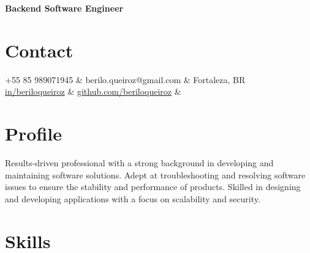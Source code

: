 \documentclass[11pt,a4paper,sans]{moderncv}
\begin{document}
\makecvtitle
\vspace*{-16mm}
\begin{center}\textbf{Backend Software Engineer}\end{center}

\section{Contact}{
  \begin{center}
	  \faMobile\enspace +55 85 989071945                                                                  & \enspace berilo.queiroz@gmail.com & \enspace\faHome\enspace Fortaleza, BR \\
	  \faLinkedin\enspace \color{blue} \href{https://www.linkedin.com/in/beriloqueiroz}{in/beriloqueiroz} &
	  \faGithub\enspace \color{blue} \href{https://github.com/beriloqueiroz}{github.com/beriloqueiroz}    & \enspace
  \end{center}
 }

\section{Profile}
 {
  Results-driven professional with a strong background in developing and maintaining software solutions. Adept at troubleshooting and resolving software issues to ensure the stability and performance of products. Skilled in designing and developing applications with a focus on scalability and security.
 }

\section{Skills}
 {
       
    \\
  \\
     \\
  \\
      \\
  \\
      \\
  \\
   \\
  \\
    \\
  \\
      \\
  \\
 }
\end{document}
